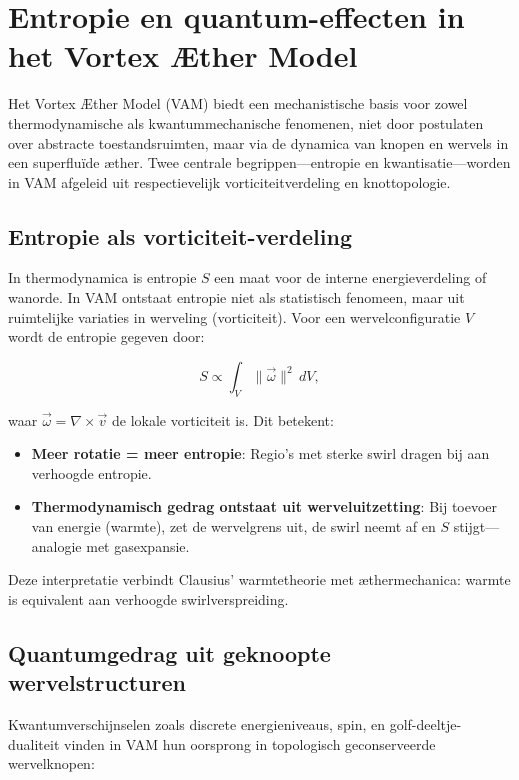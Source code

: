 
\section{Entropie en quantum-effecten in het Vortex Æther Model}

Het Vortex Æther Model (VAM) biedt een mechanistische basis voor zowel thermodynamische als kwantummechanische fenomenen, niet door postulaten over abstracte toestandsruimten, maar via de dynamica van knopen en wervels in een superfluïde æther. Twee centrale begrippen—entropie en kwantisatie—worden in VAM afgeleid uit respectievelijk vorticiteitverdeling en knottopologie.

\subsection{Entropie als vorticiteit-verdeling}

In thermodynamica is entropie $S$ een maat voor de interne energieverdeling of wanorde. In VAM ontstaat entropie niet als statistisch fenomeen, maar uit ruimtelijke variaties in werveling (vorticiteit). Voor een wervelconfiguratie $V$ wordt de entropie gegeven door:

\begin{equation}
S \propto \int_V \|\vec{\omega}\|^2 \, dV,
\end{equation}

waar $\vec{\omega} = \nabla \times \vec{v}$ de lokale vorticiteit is. Dit betekent:

\begin{itemize}
    \item \textbf{Meer rotatie = meer entropie}: Regio's met sterke swirl dragen bij aan verhoogde entropie.
    \item \textbf{Thermodynamisch gedrag ontstaat uit werveluitzetting}: Bij toevoer van energie (warmte), zet de wervelgrens uit, de swirl neemt af en $S$ stijgt—analogie met gasexpansie.
\end{itemize}

Deze interpretatie verbindt Clausius’ warmtetheorie met æthermechanica: warmte is equivalent aan verhoogde swirlverspreiding.

\subsection{Quantumgedrag uit geknoopte wervelstructuren}

Kwantumverschijnselen zoals discrete energieniveaus, spin, en golf-deeltje-dualiteit vinden in VAM hun oorsprong in topologisch geconserveerde wervelknopen:

